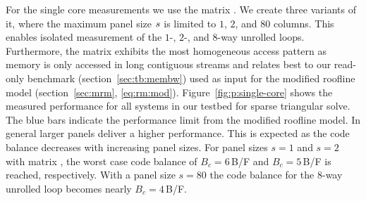 For the single core measurements we use the matrix .
We create three variants of it, where the maximum panel size $s$ is
limited to $1$, $2$, and $80$ columns.
This enables isolated measurement of the $1$-, $2$-, and $8$-way
unrolled loops.
Furthermore, the matrix  exhibits the most homogeneous access pattern
as memory is only accessed in long contiguous streams and relates best to our
read-only benchmark (section~\ref{sec:tb:membw}) used as input for the modified
roofline model (section~\ref{sec:mrm}, \eqref{eq:rm:mod}).
%
Figure~\ref{fig:p:single-core} shows the measured performance for all systems in
our testbed for sparse triangular solve.
The blue bars indicate the performance limit from the modified roofline model.
%
In general larger panels deliver a higher performance.
This is expected as the code balance decreases with increasing panel sizes.
For panel sizes $s=1$ and $s=2$ with matrix , the worst case code balance
of $B_c=6$\,B/F and $B_c=5$\,B/F is reached, respectively. 
With a panel size $s=80$ the code balance for the $8$-way unrolled loop
becomes nearly $B_c=4$\,B/F.
  
